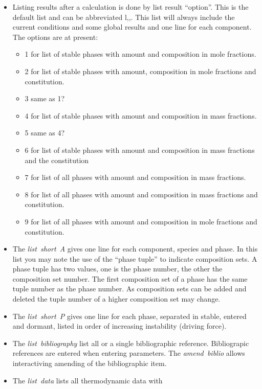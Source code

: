\documentclass[12pt]{article}
\begin{document}
\begin{itemize}
\item Listing results after a calculation is done by {\rm list result
  ``option''}.  This is the default list and can be abbreviated {\rm
  l,,}.  This list will always include the current conditions and some
  global results and one line for each component.  The options are at
  present:
  \begin{itemize}
    \item 1 for list of stable phases with amount and composition in
      mole fractions.
    \item 2 for list of stable phases with amount, composition in
      mole fractions and constitution.
    \item 3 same as 1?
    \item 4 for list of stable phases with amount and composition in
      mass fractions.
    \item 5 same as 4?
    \item 6 for list of stable phases with amount and composition in
      mass fractions and the constitution
    \item 7 for list of all phases with amount and composition in
      mass fractions.
    \item 8 for list of all phases with amount and composition in
      mass fractions and constitution.
    \item 9 for list of all phases with amount and composition in
      mole fractions and constitution.
  \end{itemize}
\item The {\em list~short~A} gives one line for each component,
  species and phase.  In this list you may note the use of the ``phase
  tuple'' to indicate composition sets.  A phase tuple has two values,
  one is the phase number, the other the composition set number.  The
  first composition set of a phase has the same tuple number as the
  phase number.  As composition sets can be added and deleted the
  tuple number of a higher composition set may change.
\item The {\em list~short~P} gives one line for each phase, separated
  in stable, entered and dormant, listed in order of increasing
  instability (driving force).
\item The {\em list~bibliography} list all or a single bibliographic
  reference.  Bibliograpic references are entered when entering
  parameters.  The {\em amend~biblio} allows interactiving amending of
  the bibliographic item.
\item The {\em list~data} lists all thermodynamic data with

\end{itemize}
\end{document}

